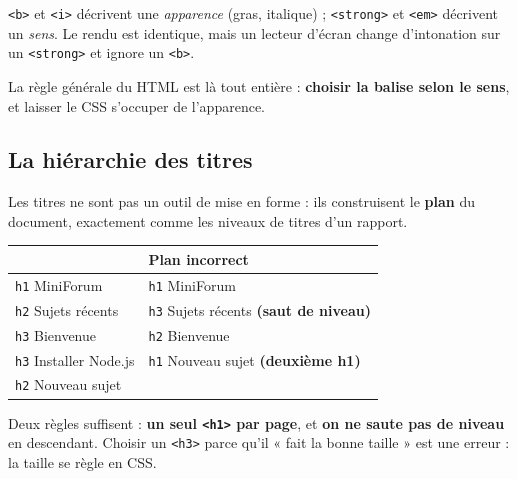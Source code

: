 \documentclass[a4paper,11pt]{article}
\newcommand{\hdr}[1]{\multicolumn{1}{l}{\color{white}\bfseries #1}}
\renewcommand{\arraystretch}{1.3}
\begin{document}
\begin{tcolorbox}[attention, title={\texttt{<strong>} plutôt que \texttt{<b>}, \texttt{<em>} plutôt que \texttt{<i>}}]
\texttt{<b>} et \texttt{<i>} décrivent une \textit{apparence} (gras, italique) ; \texttt{<strong>} et \texttt{<em>} décrivent un \textit{sens}. Le rendu est identique, mais un lecteur d'écran change d'intonation sur un \texttt{<strong>} et ignore un \texttt{<b>}.

\vspace{3pt}
La règle générale du HTML est là tout entière : \textbf{choisir la balise selon le sens}, et laisser le CSS s'occuper de l'apparence.
\end{tcolorbox}

\subsection{La hiérarchie des titres}

Les titres ne sont pas un outil de mise en forme : ils construisent le \textbf{plan} du document, exactement comme les niveaux de titres d'un rapport.

\begin{center}
\renewcommand{\arraystretch}{1.0}
\begin{tabularx}{\linewidth}{XX}
  \toprule
  \rowcolor{uniNavy}
  \hdr{Plan correct} & \hdr{Plan incorrect} \\
  \midrule
  \rowcolor{uniPaper}
  \texttt{h1} MiniForum & \texttt{h1} MiniForum \\
  \rowcolor{uniPaper}
  \quad\texttt{h2} Sujets récents & \quad\texttt{h3} Sujets récents \quad\textcolor{alertRed}{\textbf{(saut de niveau)}} \\
  \rowcolor{uniPaper}
  \quad\quad\texttt{h3} Bienvenue & \quad\quad\texttt{h2} Bienvenue \\
  \rowcolor{uniPaper}
  \quad\quad\texttt{h3} Installer Node.js & \texttt{h1} Nouveau sujet \quad\textcolor{alertRed}{\textbf{(deuxième h1)}} \\
  \rowcolor{uniPaper}
  \quad\texttt{h2} Nouveau sujet & \\
  \bottomrule
\end{tabularx}
\end{center}

\vspace{4pt}
Deux règles suffisent : \textbf{un seul \texttt{<h1>} par page}, et \textbf{on ne saute pas de niveau} en descendant. Choisir un \texttt{<h3>} parce qu'il « fait la bonne taille » est une erreur : la taille se règle en CSS.
\end{document}
